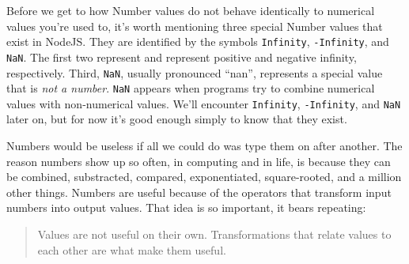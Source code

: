 
Before we get to how \textsf{Number} values do not behave identically to numerical values you're used to, it's worth mentioning three special \textsf{Number} values that exist in NodeJS. They are identified by the symbols \texttt{Infinity}, \texttt{-Infinity}, and \texttt{NaN}. The first two represent and represent positive and negative infinity, respectively. Third, \texttt{NaN}, usually pronounced ``nan'', represents a special value that is \emph{not a number}. \texttt{NaN} appears when programs try to combine numerical values with non-numerical values. We'll encounter \texttt{Infinity}, \texttt{-Infinity}, and \texttt{NaN} later on, but for now it's good enough simply to know that they exist.

Numbers would be useless if all we could do was type them on after another. The reason numbers show up so often, in computing and in life, is because they can be combined, substracted, compared, exponentiated, square-rooted, and a million other things. Numbers are useful because of the operators that transform input numbers into output values. That idea is so important, it bears repeating:

\begin{quotation}
  Values are not useful on their own. Transformations that relate values to each other are what make them useful.
\end{quotation}
